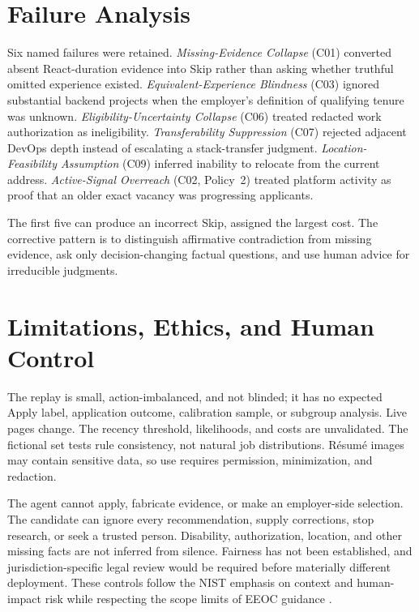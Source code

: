\documentclass{article}
\begin{document}
\section{Failure Analysis}
Six named failures were retained. \emph{Missing-Evidence Collapse} (C01) converted absent React-duration evidence into Skip rather than asking whether truthful omitted experience existed. \emph{Equivalent-Experience Blindness} (C03) ignored substantial backend projects when the employer's definition of qualifying tenure was unknown. \emph{Eligibility-Uncertainty Collapse} (C06) treated redacted work authorization as ineligibility. \emph{Transferability Suppression} (C07) rejected adjacent DevOps depth instead of escalating a stack-transfer judgment. \emph{Location-Feasibility Assumption} (C09) inferred inability to relocate from the current address. \emph{Active-Signal Overreach} (C02, Policy~2) treated platform activity as proof that an older exact vacancy was progressing applicants.

The first five can produce an incorrect Skip, assigned the largest cost. The corrective pattern is to distinguish affirmative contradiction from missing evidence, ask only decision-changing factual questions, and use human advice for irreducible judgments.

\section{Limitations, Ethics, and Human Control}
The replay is small, action-imbalanced, and not blinded; it has no expected Apply label, application outcome, calibration sample, or subgroup analysis. Live pages change. The recency threshold, likelihoods, and costs are unvalidated. The fictional set tests rule consistency, not natural job distributions. R\'esum\'e images may contain sensitive data, so use requires permission, minimization, and redaction.

The agent cannot apply, fabricate evidence, or make an employer-side selection. The candidate can ignore every recommendation, supply corrections, stop research, or seek a trusted person. Disability, authorization, location, and other missing facts are not inferred from silence. Fairness has not been established, and jurisdiction-specific legal review would be required before materially different deployment. These controls follow the NIST emphasis on context and human-impact risk while respecting the scope limits of EEOC guidance \cite{nist2023,eeoc_selection,eeoc_ada}.
\end{document}
